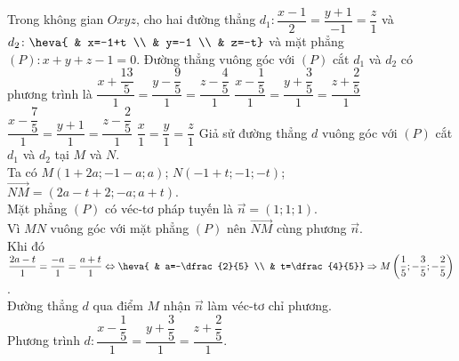 \begin{ex}%
	Trong không gian $Oxyz$, cho hai đường thẳng $d_1\colon \dfrac{x-1}{2}=\dfrac{y+1}{-1}=\dfrac{z}{1}$ và $d_2\colon \heva{ & x=-1+t \\ & y=-1 \\ & z=-t}$ và mặt phẳng $(P)\colon x+y+z-1=0$. Đường thẳng vuông góc với $(P)$ cắt $d_1$ và $d_2$ có phương trình là
	\choice
	{$\dfrac{x+\dfrac{13}{5}}{1}=\dfrac{y-\dfrac{9}{5}}{1}=\dfrac{z-\dfrac{4}{5}}{1}$}
	{\True $\dfrac{x-\dfrac{1}{5}}{1}=\dfrac{y+\dfrac{3}{5}}{1}=\dfrac{z+\dfrac{2}{5}}{1}$}
	{$\dfrac{x-\dfrac{7}{5}}{1}=\dfrac{y+1}{1}=\dfrac{z-\dfrac{2}{5}}{1}$}
	{$\dfrac{x}{1}=\dfrac{y}{1}=\dfrac{z}{1}$}
	\loigiai
	{
		Giả sử đường thẳng $d$ vuông góc với $(P)$ cắt $d_1$ và $d_2$ tại $M$ và $N$.\\
		Ta có $M(1+2a;-1-a;a)$; $N(-1+t;-1;-t)$; $\overrightarrow{NM}=(2a-t+2;-a;a+t)$.\\
		Mặt phẳng $(P)$ có véc-tơ pháp tuyến là $\overrightarrow{n}=(1;1;1)$.\\
		Vì $MN$ vuông góc với mặt phẳng $(P)$ nên $\overrightarrow{NM}$ cùng phương $\overrightarrow{n}$.\\
		Khi đó $\dfrac{2a-t}{1}=\dfrac{-a}{1}=\dfrac{a+t}{1} \Leftrightarrow \heva{ & a=-\dfrac{2}{5} \\ & t=\dfrac{4}{5}} \Rightarrow M\left(\dfrac{1}{5};-\dfrac{3}{5};-\dfrac{2}{5}\right)$.\\
		Đường thẳng $d$ qua điểm $M$ nhận $\overrightarrow{n}$ làm véc-tơ chỉ phương.\\
		Phương trình $d\colon \dfrac{x-\dfrac{1}{5}}{1}=\dfrac{y+\dfrac{3}{5}}{1}=\dfrac{z+\dfrac{2}{5}}{1}$.
	}
\end{ex}

